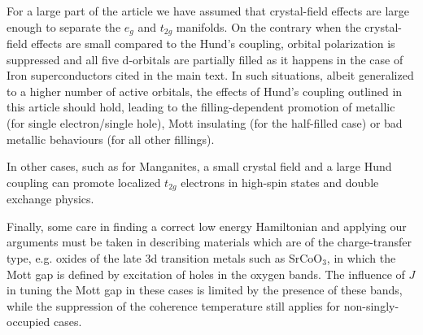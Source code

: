 \documentclass[aps,prl,amsmath, amssymb, english, aps, prl, onecolumn,
  reprint,floatfix, superscriptaddress]{revtex4-1}
\begin{document}
For a large part of the article we have assumed that crystal-field effects are large enough to separate the $e_g$ and $t_{2g}$ manifolds.
On the contrary when the crystal-field effects are small compared to the Hund's coupling,  orbital polarization is suppressed and all five d-orbitals are partially filled as it happens in the case of Iron superconductors cited in the main text. 
In such situations, albeit generalized to a higher number of active orbitals, the effects of Hund's coupling outlined in this article should hold, leading to the filling-dependent promotion of metallic (for single electron/single hole), Mott insulating (for the half-filled case) or bad metallic behaviours (for all other fillings).

In other cases, such as for Manganites, a small crystal field and a large Hund coupling can promote localized $t_{2g}$ electrons in high-spin states and double exchange physics.

Finally, some care in finding a correct low energy Hamiltonian and applying our
arguments must be taken in describing materials which
are of the charge-transfer type, e.g. oxides of the late 3d transition
metals such as SrCoO$_3$, in which the Mott gap is defined by
excitation of holes in the oxygen bands.  The influence of $J$ in tuning the Mott gap in these cases is limited by the presence of these bands, while the suppression of the coherence temperature still applies for
non-singly-occupied cases.
\end{document}
